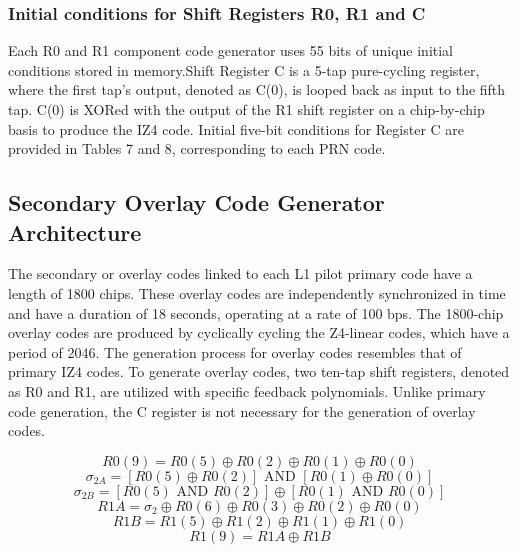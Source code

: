 \subsubsection{Initial conditions for Shift Registers R0, R1 and C}
Each R0 and R1 component code generator uses 55 bits of unique initial conditions stored in memory.Shift Register C is a 5-tap pure-cycling register, where the first tap's output, denoted as C(0), is looped back as input to the fifth tap. C(0) is XORed with the output of the R1 shift register on a chip-by-chip basis to produce the IZ4 code. Initial five-bit conditions for Register C are provided in Tables 7 and 8, corresponding to each PRN code.
\subsection{Secondary Overlay Code Generator \\Architecture}
The secondary or overlay codes linked to each L1 pilot primary code have a length of 1800 chips. These overlay codes are independently synchronized in time and have a duration of 18 seconds, operating at a rate of 100 bps. The 1800-chip overlay codes are produced by cyclically cycling the Z4-linear codes, which have a period of 2046. The generation process for overlay codes resembles that of primary IZ4 codes. To generate overlay codes, two ten-tap shift registers, denoted as R0 and R1, are utilized with specific feedback polynomials. Unlike primary code generation, the C register is not necessary for the generation of overlay codes.

\begin{equation}
R0(9) = R0(5) \oplus R0(2) \oplus R0(1) \oplus R0(0) 
\end{equation}
\begin{equation}
\sigma_{2A} = [R0(5) \oplus R0(2)] \text{ AND } [R0(1) \oplus R0(0)]
\end{equation}
\begin{equation}
\sigma_{2B} = [R0(5) \text{ AND } R0(2)] \oplus [R0(1) \text{ AND } R0(0)] 
\end{equation}
\begin{equation}
R1A = \sigma_2 \oplus R0(6) \oplus R0(3) \oplus R0(2) \oplus R0(0) 
\end{equation}
\begin{equation}
R1B = R1(5) \oplus R1(2) \oplus R1(1) \oplus R1(0) 
\end{equation}
\begin{equation}
R1(9) = R1A \oplus R1B
\end{equation}


